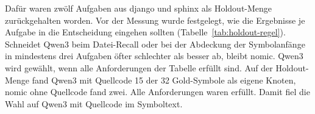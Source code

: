 Dafür waren zwölf Aufgaben aus django und sphinx als Holdout-Menge zurückgehalten worden. Vor der Messung wurde festgelegt, wie die Ergebnisse je Aufgabe in die Entscheidung eingehen sollten (Tabelle~\ref{tab:holdout-regel}). Schneidet Qwen3 beim Datei-Recall oder bei der Abdeckung der Symbolanfänge in mindestens drei Aufgaben öfter schlechter als besser ab, bleibt nomic. Qwen3 wird gewählt, wenn alle Anforderungen der Tabelle erfüllt sind. Auf der Holdout-Menge fand Qwen3 mit Quellcode 15 der 32 Gold-Symbole als eigene Knoten, nomic ohne Quellcode fand zwei. Alle Anforderungen waren erfüllt. Damit fiel die Wahl auf Qwen3 mit Quellcode im Symboltext.

